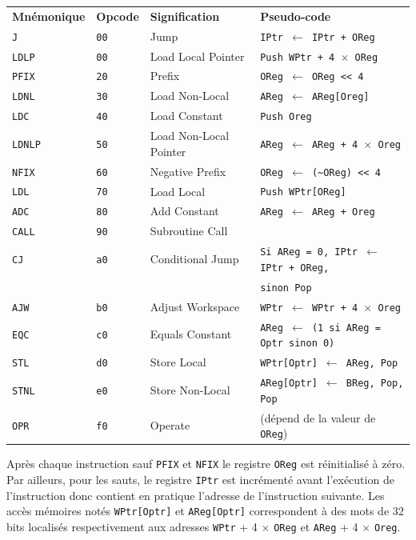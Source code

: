 \documentclass[a4paper,10pt]{article}
\newcommand{\lsl}[1]{\textless{}\textless{} #1} %
\begin{document}
\begin{tabular}{llll}
  \textbf{Mnémonique} & \textbf{Opcode} & \textbf{Signification} & \textbf{Pseudo-code} \\
  \texttt{J}     & \texttt{00} & Jump & \texttt{IPtr $\leftarrow$ IPtr + OReg} \\
  \texttt{LDLP}  & \texttt{00} & Load Local Pointer & \texttt{Push WPtr + 4 $\times$ OReg} \\
  \texttt{PFIX}  & \texttt{20} & Prefix & \texttt{OReg $\leftarrow$ OReg \lsl 4} \\
  \texttt{LDNL}  & \texttt{30} & Load Non-Local & \texttt{AReg $\leftarrow$ AReg[Oreg]} \\
  \texttt{LDC}   & \texttt{40} & Load Constant & \texttt{Push Oreg} \\
  \texttt{LDNLP} & \texttt{50} & Load Non-Local Pointer & \texttt{AReg $\leftarrow$ AReg + 4 $\times$ Oreg} \\
  \texttt{NFIX}  & \texttt{60} & Negative Prefix & \texttt{OReg $\leftarrow$ (\~{}OReg) \lsl 4} \\
  \texttt{LDL}   & \texttt{70} & Load Local & \texttt{Push WPtr[OReg]} \\
  \texttt{ADC}   & \texttt{80} & Add Constant & \texttt{AReg $\leftarrow$ AReg + Oreg} \\
  \texttt{CALL}  & \texttt{90} & Subroutine Call & \\
  \texttt{CJ}    & \texttt{a0} & Conditional Jump & \texttt{Si AReg = 0, IPtr $\leftarrow$ IPtr + OReg,} \\
                 &               &  & \texttt{sinon Pop} \\
  \texttt{AJW}   & \texttt{b0} & Adjust Workspace & \texttt{WPtr $\leftarrow$ WPtr + 4 $\times$ Oreg} \\
  \texttt{EQC}   & \texttt{c0} & Equals Constant & \texttt{AReg $\leftarrow$ (1 si AReg = Optr sinon 0)} \\
  \texttt{STL}   & \texttt{d0} & Store Local & \texttt{WPtr[Optr] $\leftarrow$ AReg, Pop} \\
  \texttt{STNL}  & \texttt{e0} & Store Non-Local & \texttt{AReg[Optr] $\leftarrow$ BReg, Pop, Pop} \\
  \texttt{OPR}   & \texttt{f0} & Operate & (dépend de la valeur de \texttt{OReg})
\end{tabular}

Après chaque instruction sauf \texttt{PFIX} et \texttt{NFIX} le registre \texttt{OReg} est réinitialisé à zéro.
Par ailleurs, pour les sauts, le registre \texttt{IPtr} est incrémenté avant l'exécution de l'instruction donc contient en pratique l'adresse de l'instruction suivante.
Les accès mémoires notés \texttt{WPtr[Optr]} et \texttt{AReg[Optr]} correspondent à des mots de 32 bits localisés respectivement aux adresses \texttt{WPtr} + 4 $\times$ \texttt{OReg} et \texttt{AReg} + 4 $\times$ \texttt{Oreg}.
\end{document}
